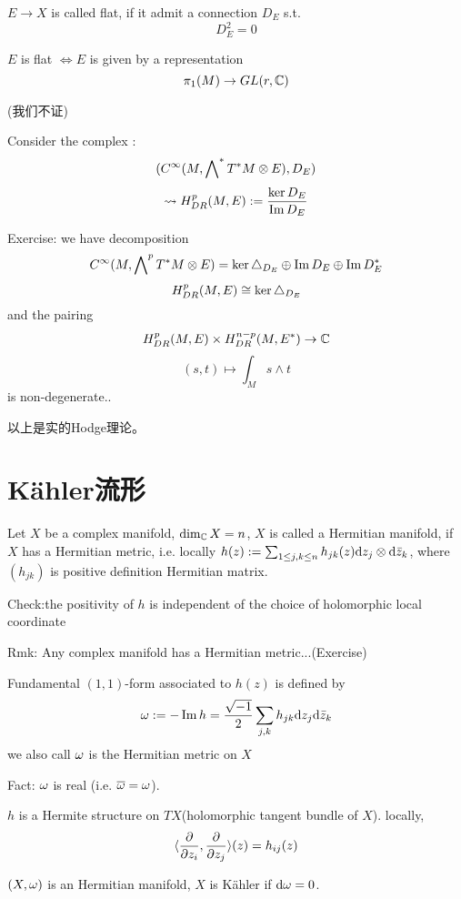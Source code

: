 \begin{definition}
$E\to X$ is called flat, if it admit a connection $D_E$ s.t.
$$D^2_E=0$$
\end{definition}
\begin{rem}
$E$ is flat $\iff E$ is given by a representation 
$$\pi_1(M)\to GL(r,\mathbb{C})$$
\end{rem}
(我们不证)

Consider the complex :
$$(C^\infty(M,\bigwedge\nolimits^*T^*M\otimes E),D_E)$$
$$\rightsquigarrow H^p_{DR}(M,E):=\frac{\ker D_E}{\operatorname{Im} D_E}$$

Exercise: we have decomposition
$$C^\infty(M,\bigwedge\nolimits^{p}T^*M\otimes E)=
\ker\triangle_{D_E}\oplus\operatorname{Im} D_E\oplus \operatorname{Im} D_E^*$$
$$H^p_{DR}(M,E)\cong \ker\triangle_{D_E}$$
and the pairing 
$$H^p_{DR}(M,E)\times H^{n-p}_{DR}(M,E^*)\to\mathbb{C}$$
$$(s,t)\mapsto \int_M s\wedge t$$
is non-degenerate..

以上是实的Hodge理论。

\section{K\"{a}hler流形}
\begin{definition}
Let $X$ be a complex manifold, $\dim_{\mathbb{C}} X=n$, 
$X$ is called a Hermitian manifold, if $X$ has a Hermitian metric, 
i.e. locally $h(z):=\sum_{1\leq j,k\leq n}h_{jk}(z)\mathrm{d} z_j\otimes\mathrm{d} \bar{z}_k$,
where $(h_{jk})$ is positive definition Hermitian matrix.
\end{definition}

Check:the positivity of $h$ is independent of the choice of holomorphic local coordinate

Rmk: Any complex manifold has a Hermitian metric...(Exercise)

Fundamental $(1,1)$-form associated to $h(z)$ is defined by 
$$\omega:=-\operatorname{Im} h=\frac{\sqrt{-1}}{2}\sum_{j,k}h_{jk}\mathrm{d} z_j\mathrm{d} \bar{z}_k$$
we also call $\omega$ is the Hermitian metric on $X$

Fact: $\omega$ is real (i.e. $\overline{\omega}=\omega$).

\begin{rem}
$h$ is a Hermite structure on $TX$(holomorphic tangent bundle of $X$).
locally, 
$$\langle \frac{\partial } {\partial z_i},\frac{\partial } {\partial z_j}\rangle(z)=h_{ij}(z)$$
\end{rem}

\begin{definition}
$(X,\omega)$ is an Hermitian manifold, $X$ is K\"{a}hler if $\mathrm{d}\omega=0$.
\end{definition}

